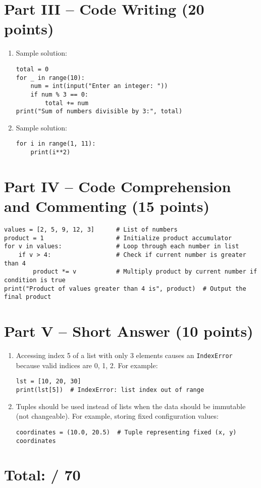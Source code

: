 \documentclass[12pt]{article}
\begin{document}
\section*{Part III – Code Writing (20 points)}

\begin{enumerate}[resume,label=\arabic*.]
    \item Sample solution:

\begin{lstlisting}
total = 0
for _ in range(10):
    num = int(input("Enter an integer: "))
    if num % 3 == 0:
        total += num
print("Sum of numbers divisible by 3:", total)
\end{lstlisting}

    \item Sample solution:

\begin{lstlisting}
for i in range(1, 11):
    print(i**2)
\end{lstlisting}
\end{enumerate}

\section*{Part IV – Code Comprehension and Commenting (15 points)}

\begin{lstlisting}
values = [2, 5, 9, 12, 3]      # List of numbers
product = 1                    # Initialize product accumulator
for v in values:               # Loop through each number in list
    if v > 4:                  # Check if current number is greater than 4
        product *= v           # Multiply product by current number if condition is true
print("Product of values greater than 4 is", product)  # Output the final product
\end{lstlisting}

\section*{Part V – Short Answer (10 points)}

\begin{enumerate}[resume,label=\arabic*.]
    \item Accessing index 5 of a list with only 3 elements causes an \texttt{IndexError} because valid indices are 0, 1, 2. For example:
\begin{lstlisting}
lst = [10, 20, 30]
print(lst[5])  # IndexError: list index out of range
\end{lstlisting}

    \item Tuples should be used instead of lists when the data should be immutable (not changeable). For example, storing fixed configuration values:
\begin{lstlisting}
coordinates = (10.0, 20.5)  # Tuple representing fixed (x, y) coordinates
\end{lstlisting}
\end{enumerate}

\section*{Total: \underline{\hspace{2cm}} / 70}
\end{document}
